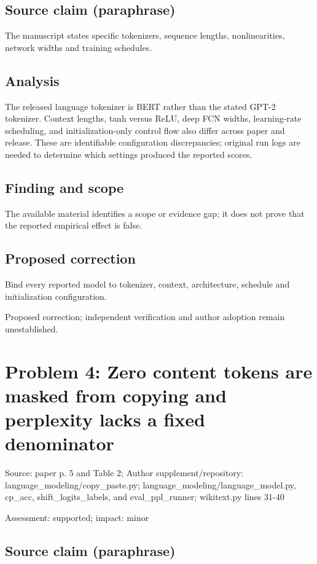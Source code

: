 \documentclass[11pt]{article}
\begin{document}
\subsection*{Source claim (paraphrase)}

The manuscript states specific tokenizers, sequence lengths, nonlinearities, network widths and training schedules.

\subsection*{Analysis}

The released language tokenizer is BERT rather than the stated GPT-2 tokenizer. Context lengths, tanh versus ReLU, deep FCN widths, learning-rate scheduling, and initialization-only control flow also differ across paper and release. These are identifiable configuration discrepancies; original run logs are needed to determine which settings produced the reported scores.

\subsection*{Finding and scope}

The available material identifies a scope or evidence gap; it does not prove that the reported empirical effect is false.

\subsection*{Proposed correction}

Bind every reported model to tokenizer, context, architecture, schedule and initialization configuration.

Proposed correction; independent verification and author adoption remain unestablished.

\section*{Problem 4: Zero content tokens are masked from copying and perplexity lacks a fixed denominator}

Source: paper p. 5 and Table 2; Author supplement/repository: language\_modeling/copy\_paste.py; language\_modeling/language\_model.py, cp\_acc, shift\_logits\_labels, and eval\_ppl\_runner; wikitext.py lines 31-40

Assessment: supported; impact: minor

\subsection*{Source claim (paraphrase)}
\end{document}
